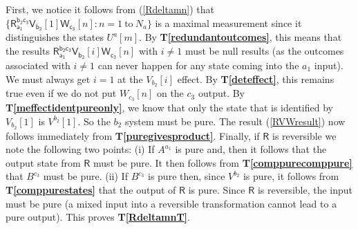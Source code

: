 \documentclass[10pt]{article}
\begin{document}
First, we notice it follows from (\ref{Rdeltamn}) that $\{ \mathsf{R_{a_1}^{b_2c_3}V_{b_2}}[1]\mathsf{W_{c_3}}[n]: n=1~\text{to}~N_a \}$ is a maximal measurement since it distinguishes the states $U^a[m]$.  By {\bf T\ref{redundantoutcomes}}, this means that the results $\mathsf{R_{a_1}^{b_2c_3}V_{b_2}}[i]\mathsf{W_{c_3}}[n]$ with $i\not=1$ must be null results (as the outcomes associated with $i\not=1$ can never happen for any state coming into the $a_1$ input). We must always get $i=1$ at the $V_{b_2}[i]$ effect.  By {\bf T\ref{deteffect}}, this remains true even if we do not put  $W_{c_3}[n]$ on the $c_3$ output.   By {\bf T\ref{meffectidentpureonly}}, we know that only the state that is identified by $V_{b_2}[1]$ is $V^{b_2}[1]$.  So the $b_2$ system must be pure.  The result (\ref{RVWresult}) now follows immediately from {\bf T\ref{puregivesproduct}}. Finally, if $\mathsf R$ is reversible we note the following two points: (i) If $A^{a_1}$ is pure and, then it follows that the output state from $\mathsf R$ must be pure.  It then follows from {\bf T\ref{comppurecomppure}} that $B^{c_3}$ must be pure.  (ii) If $B^{c_3}$ is pure then, since $V^{b_2}$ is pure, it follows from {\bf T\ref{comppurestates}} that the output of $\mathsf R$ is pure.  Since $\mathsf R$ is reversible, the input must be pure (a mixed input into a reversible transformation cannot lead to a pure output).  This proves {\bf T\ref{RdeltamnT}}.
\end{document}
